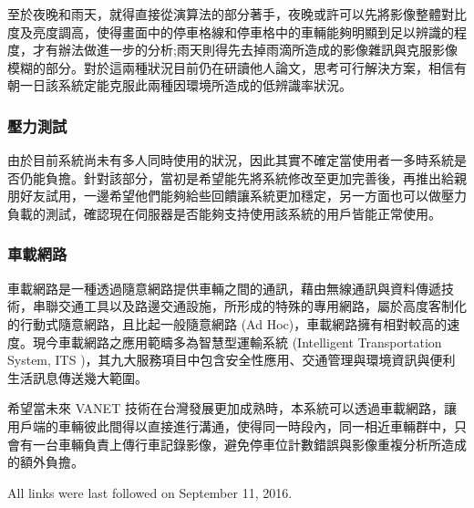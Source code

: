 \documentclass[runningheads,a4paper]{llncs}
\begin{document}
\begin{CJK}{UTF8}{bsmi}
至於夜晚和雨天，就得直接從演算法的部分著手，夜晚或許可以先將影像整體對比度及亮度調高，使得畫面中的停車格線和停車格中的車輛能夠明顯到足以辨識的程度，才有辦法做進一步的分析;雨天則得先去掉雨滴所造成的影像雜訊與克服影像模糊的部分。對於這兩種狀況目前仍在研讀他人論文，思考可行解決方案，相信有朝一日該系統定能克服此兩種因環境所造成的低辨識率狀況。

\subsubsection{壓力測試}

由於目前系統尚未有多人同時使用的狀況，因此其實不確定當使用者一多時系統是否仍能負擔。針對該部分，當初是希望能先將系統修改至更加完善後，再推出給親朋好友試用，一邊希望他們能夠給些回饋讓系統更加穩定，另一方面也可以做壓力負載的測試，確認現在伺服器是否能夠支持使用該系統的用戶皆能正常使用。

\subsubsection{車載網路}

車載網路是一種透過隨意網路提供車輛之間的通訊，藉由無線通訊與資料傳遞技術，串聯交通工具以及路邊交通設施，所形成的特殊的專用網路，屬於高度客制化的行動式隨意網路，且比起一般隨意網路
(Ad Hoc)，車載網路擁有相對較高的速度\cite{AdHoc}。現今車載網路之應用範疇多為智慧型運輸系統 (Intelligent
Transportation System, ITS
)，其九大服務項目中包含安全性應用、交通管理與環境資訊與便利生活訊息傳送幾大範圍。

希望當未來 VANET 技術在台灣發展更加成熟時，本系統可以透過車載網路，讓用戶端的車輛彼此間得以直接進行溝通，使得同一時段內，同一相近車輛群中，只會有一台車輛負責上傳行車記錄影像，避免停車位計數錯誤與影像重複分析所造成的額外負擔。






All links were last followed on September 11, 2016.

\end{CJK}
\end{document}
